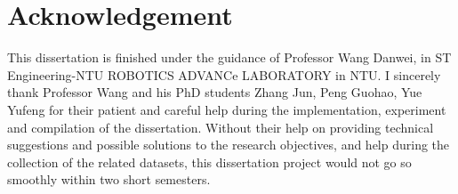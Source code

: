 
\chapter*{Acknowledgement}

This dissertation is finished under the guidance of Professor Wang Danwei, in ST Engineering-NTU ROBOTICS ADVANCe LABORATORY in NTU.
I sincerely thank Professor Wang and his PhD students Zhang Jun, Peng Guohao, Yue Yufeng for their patient and careful help during the implementation, experiment and compilation of the dissertation. 
Without their help on providing technical suggestions and possible solutions to the research objectives, and help during the collection of the related datasets, this dissertation project would not go so smoothly within two short semesters.


